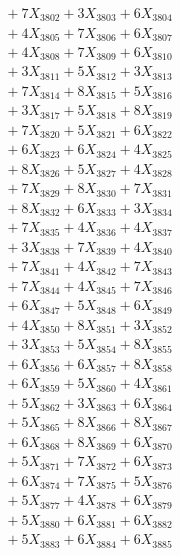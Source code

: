 \documentclass[a4paper,10pt]{article}
\begin{document}
{\begin{align}
&\;  + 7 X_{3802} + 3 X_{3803} + 6 X_{3804} \\[0.3ex]
&\;  + 4 X_{3805} + 7 X_{3806} + 6 X_{3807} \\[0.3ex]
&\;  + 4 X_{3808} + 7 X_{3809} + 6 X_{3810} \\[0.3ex]
&\;  + 3 X_{3811} + 5 X_{3812} + 3 X_{3813} \\[0.3ex]
&\;  + 7 X_{3814} + 8 X_{3815} + 5 X_{3816} \\[0.3ex]
&\;  + 3 X_{3817} + 5 X_{3818} + 8 X_{3819} \\[0.5ex]\allowbreak
&\;  + 7 X_{3820} + 5 X_{3821} + 6 X_{3822} \\[0.3ex]
&\;  + 6 X_{3823} + 6 X_{3824} + 4 X_{3825} \\[0.3ex]
&\;  + 8 X_{3826} + 5 X_{3827} + 4 X_{3828} \\[0.3ex]
&\;  + 7 X_{3829} + 8 X_{3830} + 7 X_{3831} \\[0.3ex]
&\;  + 8 X_{3832} + 6 X_{3833} + 3 X_{3834} \\[0.3ex]
&\;  + 7 X_{3835} + 4 X_{3836} + 4 X_{3837} \\[0.3ex]
&\;  + 3 X_{3838} + 7 X_{3839} + 4 X_{3840} \\[0.3ex]
&\;  + 7 X_{3841} + 4 X_{3842} + 7 X_{3843} \\[0.3ex]
&\;  + 7 X_{3844} + 4 X_{3845} + 7 X_{3846} \\[0.3ex]
&\;  + 6 X_{3847} + 5 X_{3848} + 6 X_{3849} \\[0.5ex]\allowbreak
&\;  + 4 X_{3850} + 8 X_{3851} + 3 X_{3852} \\[0.3ex]
&\;  + 3 X_{3853} + 5 X_{3854} + 8 X_{3855} \\[0.3ex]
&\;  + 6 X_{3856} + 6 X_{3857} + 8 X_{3858} \\[0.3ex]
&\;  + 6 X_{3859} + 5 X_{3860} + 4 X_{3861} \\[0.3ex]
&\;  + 5 X_{3862} + 3 X_{3863} + 6 X_{3864} \\[0.3ex]
&\;  + 5 X_{3865} + 8 X_{3866} + 8 X_{3867} \\[0.3ex]
&\;  + 6 X_{3868} + 8 X_{3869} + 6 X_{3870} \\[0.3ex]
&\;  + 5 X_{3871} + 7 X_{3872} + 6 X_{3873} \\[0.3ex]
&\;  + 6 X_{3874} + 7 X_{3875} + 5 X_{3876} \\[0.3ex]
&\;  + 5 X_{3877} + 4 X_{3878} + 6 X_{3879} \\[0.5ex]\allowbreak
&\;  + 5 X_{3880} + 6 X_{3881} + 6 X_{3882} \\[0.3ex]
&\;  + 5 X_{3883} + 6 X_{3884} + 6 X_{3885} \\[0.3ex]

\end{align}}
\end{document}
